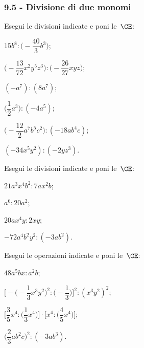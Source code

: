 \subsubsection*{9.5 - Divisione di due monomi}
\begin{esercizio}
 \label{ese:9.21}
Esegui le divisioni indicate e poni le~$\CE$:
\begin{multicols}{2}
\begin{enumeratea}
\spazielenx
 \item $15b^{8}:\bigg(-{\dfrac{40}{3}}b^{3}\bigg)$;
 \item $\bigg(-{\dfrac{13}{72}}x^{2}y^{5}z^{3}\bigg):\bigg(-{\dfrac{26}{27}}xyz\bigg)$;
 \item $(-a^{7}):(8a^{7})$;
 \item $\bigg(\dfrac{1}{2}a^{3}\bigg):(-4a^{5})$;
 \item $\bigg(-{\dfrac{12}{2}}a^{7}b^{5}c^{2}\bigg):(-18ab^{4}c)$;
 \item $(-34x^{5}y^{2}):(-2yz^{3})$.
\end{enumeratea}
\end{multicols}
\end{esercizio}

\begin{esercizio}
 \label{ese:9.22}
Esegui le divisioni indicate e poni le~$\CE$:
\begin{multicols}{2}
\begin{enumeratea}
 \item $21a^{3}x^{4}b^{2}:7ax^{2}b$;
 \item $a^{6}:20a^{2}$;
 \item $20ax^{4}y:2xy$;
 \item $-72a^{4}b^{2}y^{2}:(-3ab^{2})$.
\end{enumeratea}
\end{multicols}
\end{esercizio}

\begin{esercizio}
 \label{ese:9.23}
Esegui le operazioni indicate e poni le~$\CE$:
\begin{multicols}{2}
\begin{enumeratea}
 \item $48a^{5}bx:a^{2}b$;
 \item $\Bigg[-\bigg(-{\dfrac{1}{3}}x^{3}y^{2}\bigg)^{2}:\bigg(-{\dfrac{1}{3}}\bigg)\Bigg]^{2}:(x^{3}y^{2})^{2}$;
 \item $\Bigg[\dfrac{3}{5}x^{4}:\bigg(\dfrac{1}{3}x^{4}\bigg)\Bigg]\cdot\Bigg[x^{4}:\bigg(\dfrac{4}{5}x^{4}\bigg)\Bigg]$;
 \item $\bigg(\dfrac{2}{3}ab^{2}c\bigg)^{2}:(-3ab^{3})$.
\end{enumeratea}
\end{multicols}
\end{esercizio}

